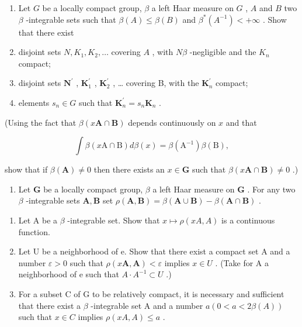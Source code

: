 \begin{enumerate}
\def\labelenumi{\arabic{enumi})}
\setcounter{enumi}{8}
\item
  Let \(G\) be a locally compact group, \(\beta\) a left Haar measure on \(G\) , \(A\) and \(B\) two \(\beta\) -integrable sets such that \(\beta(A) \leqslant \beta(B)\) and \(\beta^{*}(A^{-1}) < +\infty\) . Show that there exist
\item
  disjoint sets \(N, K_{1}, K_{2}, \ldots\) covering \(A\) , with \(N \beta\) -negligible and the \(K_{n}\) compact;
\item
  disjoint sets \(\mathbf{N}^{\prime}\) , \(\mathbf{K}_1^{\prime}\) , \(\mathbf{K}_2^{\prime}\) , \ldots{} covering B, with the \(\mathbf{K}_n^{\prime}\) compact;\\
\item
  elements \(s_n \in G\) such that \(\mathbf{K}_n^{\prime} = s_n\mathbf{K}_n\) .
\end{enumerate}

(Using the fact that \(\beta (x\mathbf{A}\cap \mathbf{B})\) depends continuously on \(x\) and that

\[
\int \beta (x \mathrm{A} \cap \mathrm{B}) d \beta (x) = \beta (\mathrm{A} ^ {- 1}) \beta (\mathrm{B}),
\]

show that if \(\beta (\mathbf{A})\neq 0\) then there exists an \(x\in \mathbf{G}\) such that \(\beta (x\mathbf{A}\cap \mathbf{B})\neq 0\) .)

\begin{enumerate}
\def\labelenumi{\arabic{enumi})}
\setcounter{enumi}{9}
\tightlist
\item
  Let \(\mathbf{G}\) be a locally compact group, \(\beta\) a left Haar measure on \(\mathbf{G}\) . For any two \(\beta\) -integrable sets \(\mathbf{A}, \mathbf{B}\) set \(\rho(\mathbf{A}, \mathbf{B}) = \beta(\mathbf{A} \cup \mathbf{B}) - \beta(\mathbf{A} \cap \mathbf{B})\) .
\end{enumerate}

\begin{enumerate}
\def\labelenumi{\alph{enumi})}
\item
  Let A be a \(\beta\) -integrable set. Show that \(x \mapsto \rho(xA, A)\) is a continuous function.
\item
  Let U be a neighborhood of e. Show that there exist a compact set A and a number \(\varepsilon > 0\) such that \(\rho(x\mathbf{A}, \mathbf{A}) < \varepsilon\) implies \(x \in U\) . (Take for A a neighborhood of e such that \(A \cdot A^{-1} \subset U\) .)
\item
  For a subset C of G to be relatively compact, it is necessary and sufficient that there exist a \(\beta\) -integrable set A and a number \(a (0 < a < 2\beta(A))\) such that \(x \in C\) implies \(\rho(xA, A) \leqslant a\) .
\end{enumerate}

